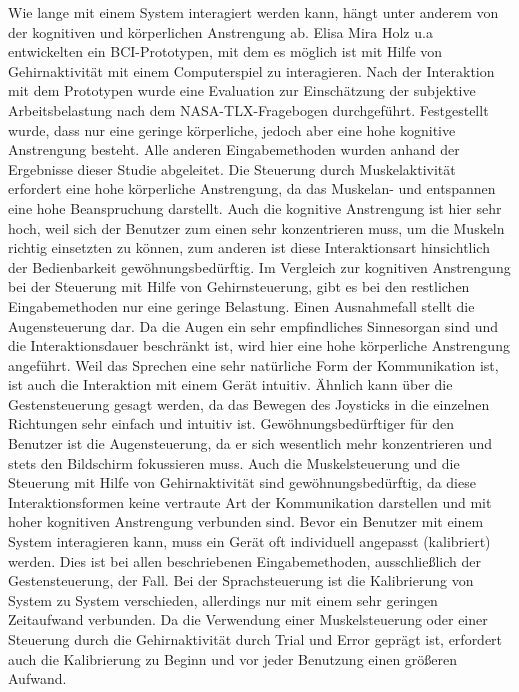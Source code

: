 \newline \newline
Wie lange mit einem System interagiert werden kann, hängt unter anderem von der kognitiven und körperlichen Anstrengung ab. Elisa Mira Holz u.a \cite{holz2013brain} entwickelten ein BCI-Prototypen, mit dem es möglich ist mit Hilfe von Gehirnaktivität mit einem Computerspiel zu interagieren. Nach der Interaktion mit dem Prototypen wurde eine Evaluation zur Einschätzung der subjektive Arbeitsbelastung nach dem NASA-TLX-Fragebogen durchgeführt. Festgestellt wurde, dass nur eine geringe körperliche, jedoch aber eine hohe kognitive Anstrengung besteht. Alle anderen Eingabemethoden wurden anhand der Ergebnisse dieser Studie abgeleitet. Die Steuerung durch Muskelaktivität erfordert eine hohe körperliche Anstrengung, da das Muskelan- und entspannen eine hohe Beanspruchung darstellt. Auch die kognitive Anstrengung ist hier sehr hoch, weil sich der Benutzer zum einen sehr konzentrieren muss, um die Muskeln richtig einsetzten zu können, zum anderen ist diese Interaktionsart hinsichtlich der Bedienbarkeit gewöhnungsbedürftig. Im Vergleich zur kognitiven Anstrengung bei der Steuerung mit Hilfe von Gehirnsteuerung, gibt es bei den restlichen Eingabemethoden nur eine geringe Belastung. Einen Ausnahmefall stellt die Augensteuerung dar. Da die Augen ein sehr empfindliches Sinnesorgan sind und die Interaktionsdauer beschränkt ist, wird hier eine hohe körperliche Anstrengung angeführt.
\newline \newline
Weil das Sprechen eine sehr natürliche Form der Kommunikation ist, ist auch die Interaktion mit einem Gerät intuitiv. Ähnlich kann über die Gestensteuerung gesagt werden, da das Bewegen des Joysticks in die einzelnen Richtungen sehr einfach und intuitiv ist. Gewöhnungsbedürftiger für den Benutzer ist die Augensteuerung, da er sich wesentlich mehr konzentrieren und stets den Bildschirm fokussieren muss. Auch die Muskelsteuerung und die Steuerung mit Hilfe von Gehirnaktivität sind gewöhnungsbedürftig, da diese Interaktionsformen keine vertraute Art der Kommunikation darstellen und mit hoher kognitiven Anstrengung verbunden sind.
\newline \newline
Bevor ein Benutzer mit einem System interagieren kann, muss ein Gerät oft individuell angepasst (kalibriert) werden. Dies ist bei allen beschriebenen Eingabemethoden, ausschließlich der Gestensteuerung, der Fall. Bei der Sprachsteuerung ist die Kalibrierung von System zu System verschieden, allerdings nur mit einem sehr geringen Zeitaufwand verbunden. Da die Verwendung einer Muskelsteuerung oder einer Steuerung durch die Gehirnaktivität durch Trial und Error geprägt ist, erfordert auch die Kalibrierung zu Beginn und vor jeder Benutzung einen größeren Aufwand.
